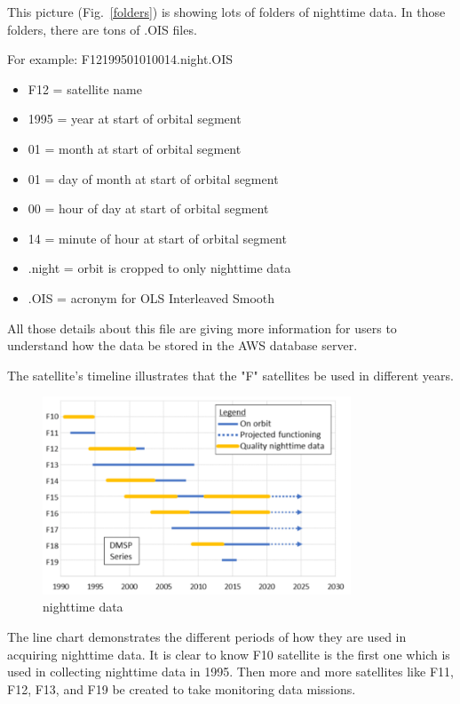\documentclass[conference]{IEEEtran}
\begin{document}
This picture (Fig.~\ref{folders}) is showing lots of folders of nighttime data.  In those folders, there are tons of .OIS files. 

For example: F12199501010014.night.OIS

\begin{itemize}
	\item F12 = satellite name
	\item 1995 = year at start of orbital segment 
	\item 01 = month at start of orbital segment 
	\item 01 = day of month at start of orbital segment 
	\item 00 = hour of day at start of orbital segment
	\item 14 = minute of hour at start of orbital segment 
	\item .night = orbit is cropped to only nighttime data 
	\item .OIS = acronym for OLS Interleaved Smooth
\end{itemize}


All those details about this file are giving more information for users to understand how the data be stored in the AWS database server. 

The satellite's timeline illustrates that the "F" satellites be used in different years.

\begin{figure}[htbp]
\centerline{\includegraphics[width=260pt]{images/2.1.png}}
\caption{nighttime data}
\label{nighttimedata}
\end{figure}

The line chart demonstrates the different periods of how they are used in acquiring nighttime data.  It is clear to know F10 satellite 
is the first one which is used in collecting nighttime data in 1995. Then more and more satellites like F11, F12, F13, and F19 be created 
to take monitoring data missions.
\end{document}
